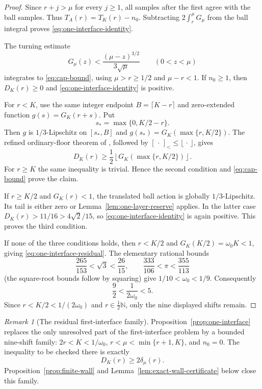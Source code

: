 \documentclass[11pt]{article}
\theoremstyle{remark}
\newtheorem{remark}[theorem]{Remark}
\newcommand{\N}{\mathbb N}
\begin{document}
\begin{proof}
Since $r+j>\mu$ for every $j\geq1$, all samples after the first agree
with the ball samples.  Thus $T_A(r)=T_K(r)-n_0$.  Subtracting
$2\int_r^\mu G_\mu$ from the ball integral proves
\eqref{eq:one-interface-identity}.

The turning estimate
\[
 G_\mu(z)<\frac{(\mu-z)^{3/2}}{3\sqrt\mu}
 \qquad(0<z<\mu)
\]
integrates to \eqref{eq:cap-bound}, using $\mu>r\geq1/2$ and
$\mu-r<1$.  If $n_0\geq1$, then $D_K(r)\geq0$ and
\eqref{eq:one-interface-identity} is positive.

For $r<K$, use the same integer endpoint
$B=\lceil K-r\rceil$ and zero-extended function
$g(s)=G_K(r+s)$.  Put
\[
 s_*=\max\{0,K/2-r\}.
\]
Then $g$ is $1/3$-Lipschitz on $[s_*,B]$ and
$g(s_*)=G_K(\max\{r,K/2\})$.  The refined ordinary-floor theorem of
\cite[Theorem~3.4]{FLPSannuli}, followed by
$[\,\cdot\,]_<\leq\lfloor\,\cdot\,\rfloor$, gives
\begin{equation}
 D_K(r)\geq\frac12
 \left\lfloor G_K(\max\{r,K/2\})\right\rfloor.
 \label{eq:refined-ball-reserve}
\end{equation}
For $r\geq K$ the same inequality is trivial.  Hence the second condition
and \eqref{eq:cap-bound} prove the claim.

If $r\geq K/2$ and $G_K(r)<1$, the translated ball action is globally
$1/3$-Lipschitz.  Its tail is either zero or
Lemma~\ref{lem:one-layer-reserve} applies.  In the latter case
$D_K(r)>11/16>4\sqrt2/15$, so \eqref{eq:one-interface-identity} is again
positive.  This proves the third condition.

If none of the three conditions holds, then $r<K/2$ and
$G_K(K/2)=\omega_0K<1$, giving \eqref{eq:one-interface-residual}.  The
elementary rational bounds
\[
 \frac{265}{153}<\sqrt3<\frac{26}{15},
 \qquad
 \frac{333}{106}<\pi<\frac{355}{113}
\]
(the square-root bounds follow by squaring) give
$1/10<\omega_0<1/9$.  Consequently
\[
 \frac92<\frac1{2\omega_0}<5.
\]
Since $r<K/2<1/(2\omega_0)$ and $r\in\tfrac12\N$, only the nine displayed
shifts remain.
\end{proof}

\begin{remark}[The residual first-interface family]
Proposition~\ref{prop:one-interface} replaces the only unresolved part of
the first-interface problem by a bounded nine-shift family:
$2r<K<1/\omega_0$, $r<\mu<\min\{r+1,K\}$, and $n_0=0$.  The inequality to
be checked there is exactly
\[
 D_K(r)\geq2\delta_\mu(r).
\]
Proposition~\ref{prop:finite-wall} and
Lemma~\ref{lem:exact-wall-certificate} below close this family.
\end{remark}
\end{document}

